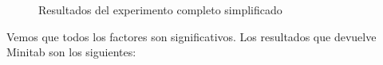 \documentclass[12pt,a4paper,twoside,openright,titlepage,final]{article}
\begin{document}
\begin{figure}[htbp!]
	\centering
	\caption{Resultados del experimento completo simplificado} \label{fig:resultado_experimento_completo_2}
\end{figure}

Vemos que todos los factores son significativos. Los resultados que devuelve Minitab son los siguientes:
\end{document}
